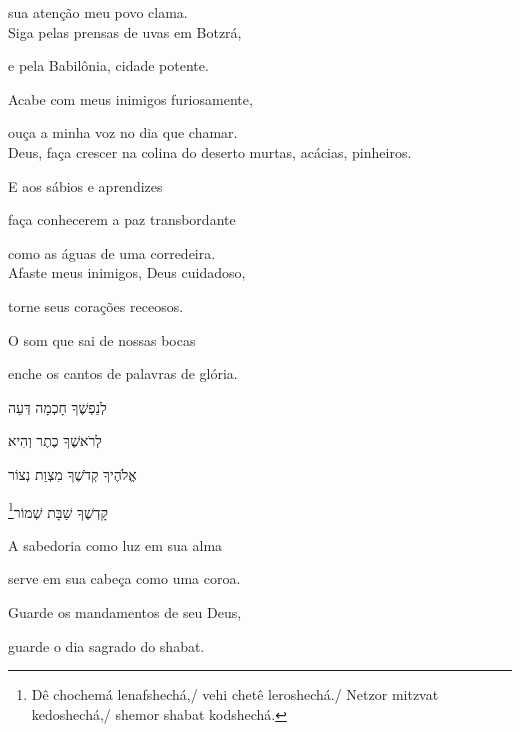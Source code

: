 sua atenção meu povo clama.\\[10pt]


Siga pelas prensas de uvas em Botzrá,

e pela Babilônia, cidade potente.

Acabe com meus inimigos furiosamente,

ouça a minha voz no dia que chamar.\\[10pt]


Deus, faça crescer na colina do deserto murtas, acácias, pinheiros.

E aos sábios e aprendizes

faça conhecerem a paz transbordante

como as águas de uma corredeira.\\[10pt]


Afaste meus inimigos, Deus cuidadoso,

torne seus corações receosos.

O som que sai de nossas bocas

enche os cantos de palavras de glória.


\movetoevenpage
\raggedleft %

\vspace*{1cm}

לְנַפְשֶׁךָ חָכְמָה דְּעֵה

לְרֹאשֶׁךָ כֶתֶר וְהִיא

אֱלֹהֶיךָ קְדֹשֶׁךָ מִצְוַת נְצוֹר

\footnote{Dê chochemá lenafshechá,/ vehi chetê leroshechá./ Netzor mitzvat kedoshechá,/ shemor shabat kodshechá.}קָדְשֶׁךָ שַׁבָּת שְׁמוֹר 

\movetooddpage
\raggedright %

\vspace*{1cm}

A sabedoria como luz em sua alma

serve em sua cabeça como uma coroa.

Guarde os mandamentos de seu Deus,

guarde o dia sagrado do shabat.\\[10pt]




\endgroup

